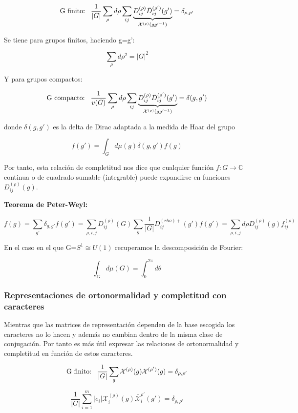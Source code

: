 \documentclass{article}
\begin{document}
    $$\text{G finito:} \hspace{0.3cm} \frac{1}{|G|}\sum _\rho d\rho \sum _{ij} \underbrace{D_{ij}^{(\rho)}\bar{D}_{ij}^{(\rho ')}(g')}_{\mathcal{X}^{(\rho)}(gg'^{-1})}=\delta _{\rho, \rho '}$$

    Se tiene para grupos finitos, haciendo g=g':

    $$\sum _\rho d\rho ^2 =|G|^2$$

    Y para grupos compactos:

     $$\text{G compacto:} \hspace{0.3cm} \frac{1}{v(G)}\sum _\rho d\rho \sum _{ij} \underbrace{D_{ij}^{(\rho)}\bar{D}_{ij}^{(\rho ')}(g')}_{\mathcal{X}^{(\rho)}(gg'^{-1})}=\delta (g,g')$$

    donde $\delta (g,g')$ es la delta de Dirac adaptada a la medida de Haar del grupo

    $$f(g')=\int _G d\mu (g)\delta (g,g')f(g)$$

    Por tanto, esta relación de completitud nos dice que cualquier función $f: G \to \mathds{C}$ continua o de cuadrado sumable (integrable) puede expandirse en funciones $D^{(\rho)}_{ij}(g)$.

    \smallskip
    \textbf{Teorema de Peter-Weyl:}

    $$f(g)=\sum _{g'}\delta _{g,g'}f(g')=\sum _{\rho,i,j}D_{ij}^{(\rho)}(G)\sum _g \frac{1}{|G|}D_{ij}^{(rho)+}(g')f(g')=\sum _{\rho ,i, j} d\rho D_{ij}^{(\rho)}(g)f_{ij}^{(\rho)}$$

    \smallskip
     En el caso en el que G=$S^1\cong U(1)$ recuperamos la descomposición de Fourier:

     $$\int _G d \mu (G)=\int ^{2\pi}_0 d\theta$$

    \subsubsection{Representaciones de ortonormalidad y completitud con caracteres}

    Mientras que las matrices de representación dependen de la base escogida los caracteres no lo hacen y además no cambian dentro de la misma clase de conjugación. Por tanto es más útil expresar las relaciones de ortonormalidad y completitud en función de estos caracteres.

         $$\text{G finito:} \hspace{0.3cm} \frac{1}{|G|}\sum _g\mathcal{X}^{(\rho)}(g)\mathcal{X}^{(\rho ')}(g)=\delta _{\rho , \rho '}$$

         $$\frac{1}{|G|}\sum _{i=1}^m |e_i|\mathcal{X}_i^{(\rho)}(g)\bar{\mathcal{X}}_i^{\rho '}(g')=\delta _{\rho , \rho '}$$
\end{document}
